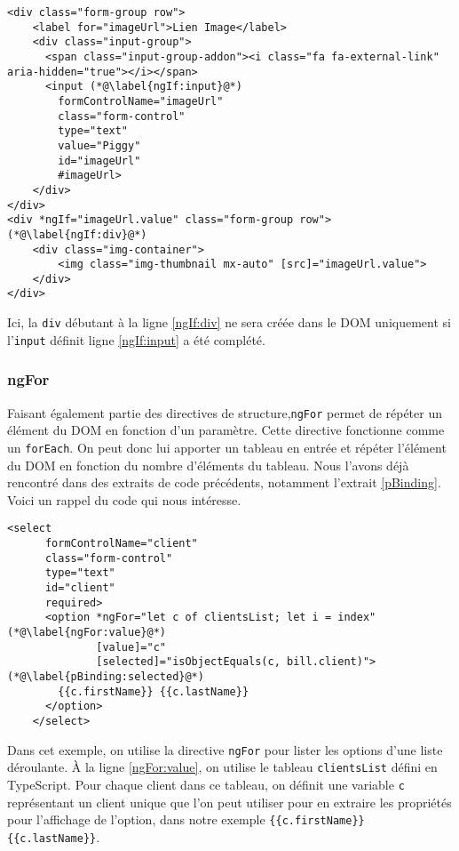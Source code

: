 \begin{lstlisting}[style=htmlcssjs, caption={ngIf}, label=ngIf]
<div class="form-group row">
	<label for="imageUrl">Lien Image</label>
	<div class="input-group">
	  <span class="input-group-addon"><i class="fa fa-external-link" aria-hidden="true"></i></span>
	  <input (*@\label{ngIf:input}@*)
	    formControlName="imageUrl"
	    class="form-control"
	    type="text"
	    value="Piggy"
	    id="imageUrl"
	    #imageUrl>
	</div>
</div>
<div *ngIf="imageUrl.value" class="form-group row"> (*@\label{ngIf:div}@*)
	<div class="img-container">
		<img class="img-thumbnail mx-auto" [src]="imageUrl.value">
	</div>
</div>
\end{lstlisting}
Ici, la \texttt{div} débutant à la ligne \ref{ngIf:div} ne sera créée dans le DOM uniquement si l'\texttt{input} définit ligne \ref{ngIf:input} a été complété.

\subsubsection{ngFor}
Faisant également partie des directives de structure,\texttt{ngFor} permet de répéter un élément du DOM en fonction d'un paramètre. Cette directive fonctionne comme un \texttt{forEach}. On peut donc lui apporter un tableau en entrée et répéter l'élément du DOM en fonction du nombre d'éléments du tableau. Nous l'avons déjà rencontré dans des extraits de code précédents, notamment l'extrait \ref{pBinding}. Voici un rappel du code qui nous intéresse.

\begin{lstlisting}[style=htmlcssjs, caption={ngFor}, label=ngFor]
<select
      formControlName="client"
      class="form-control"
      type="text"
      id="client"
      required>
      <option *ngFor="let c of clientsList; let i = index"(*@\label{ngFor:value}@*)
              [value]="c" 
              [selected]="isObjectEquals(c, bill.client)"> (*@\label{pBinding:selected}@*)
        {{c.firstName}} {{c.lastName}}
      </option>
    </select>
\end{lstlisting}
Dans cet exemple, on utilise la directive \texttt{ngFor} pour lister les options d'une liste déroulante. À la ligne \ref{ngFor:value}, on utilise le tableau \texttt{clientsList} défini en TypeScript. Pour chaque client dans ce tableau, on définit une variable \texttt{c} représentant un client unique que l'on peut utiliser pour en extraire les propriétés pour l'affichage de l'option, dans notre exemple \texttt{\{\{c.firstName\}\} \{\{c.lastName\}\}}.

